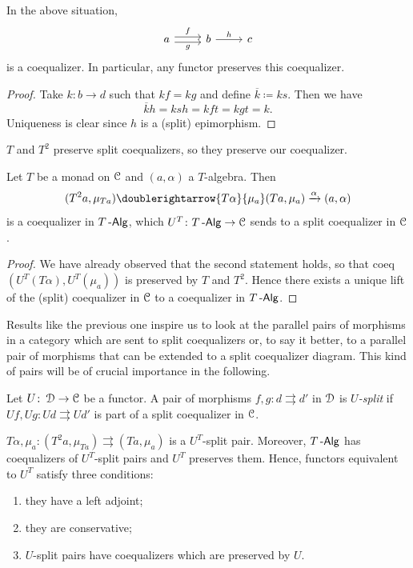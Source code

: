 \documentclass[a4paper,11pt,oneside,openany]{scrbook}
\begin{document}
\begin{prop}
	In the above situation,
	\[
		\begin{tikzcd}[ampersand replacement=\&]
			a\arrow[r, shift left, "f"] \arrow[r, shift right, "g"']
			\& b \arrow[r, "h"] \& c
		\end{tikzcd}
	\] is a coequalizer. In particular, any functor preserves this coequalizer.
\end{prop}
\begin{proof}
	Take $k\colon b\to d$ such that $kf=kg$ and define $\overline{k}\coloneqq ks$. Then we have
	$$\overline{k}h=ksh=kft=kgt=k.$$
	Uniqueness is clear since $h$ is a (split) epimorphism.
\end{proof}
$T$ and $T^2$ preserve split coequalizers, so they preserve our coequalizer.
\begin{cor}
	Let $T$ be a monad on $\operatorname{\mathcal{C}}$ and $(a,\alpha)$ a $T$-algebra. Then
	\[
		(T^2a,\mu_{Ta}) \doublerightarrow{T\alpha}{\mu_a}(Ta,\mu_a)\xrightarrow{\alpha}(a,\alpha)
	\]
	is a coequalizer in $T\operatorname{-\mathsf{Alg}}$, which $U^T\colon T\operatorname{-\mathsf{Alg}}\to\operatorname{\mathcal{C}}$ sends to a split coequalizer in $\operatorname{\mathcal{C}}$.
\end{cor}
\begin{proof}
	We have already observed that the second statement holds, so that coeq$(U^T(T\alpha), U^T(\mu_a))$ is preserved by $T$ and $T^2$. Hence there exists a unique lift of the (split) coequalizer in $\operatorname{\mathcal{C}}$ to a coequalizer in $T\operatorname{-\mathsf{Alg}}$.
\end{proof}
Results like the previous one inspire us to look at the parallel pairs of morphisms in a category which are sent to split coequalizers or, to say it better, to a parallel pair of morphisms that can be extended to a split coequalizer diagram. This kind of pairs will be of crucial importance in the following.
\begin{defn}
	Let $U\colon\operatorname{\mathcal{D}}\to\operatorname{\mathcal{C}}$ be a functor. A pair of morphisms $f,g\colon d\rightrightarrows d'$ in $\operatorname{\mathcal{D}}$ is \emph{$U$-split} if $Uf,Ug\colon Ud\rightrightarrows Ud'$ is part of a split coequalizer in $\operatorname{\mathcal{C}}$.
\end{defn}
\begin{rmk}
	$T\alpha,\mu_a\colon(T^2a,\mu_{Ta})\rightrightarrows(Ta,\mu_a)$ is a $U^T$-split pair. Moreover, $T\operatorname{-\mathsf{Alg}}$ has coequalizers of $U^T$-split pairs and $U^T$ preserves them. Hence, functors equivalent to $U^T$ satisfy three conditions:
	\begin{enumerate}
		\item they have a left adjoint;
		\item they are conservative;
		\item $U$-split pairs have coequalizers which are preserved by $U$.
	\end{enumerate}
\end{rmk}
\end{document}
